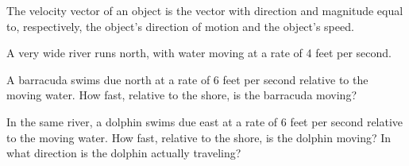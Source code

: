 The velocity vector of an object is the vector with direction and magnitude equal to, respectively, the object's direction of motion and the object's speed.

\begin{ex}
    A very wide river runs north, with water moving at a rate of 4 feet per second.
    
    A barracuda swims due north at a rate of 6 feet per second relative to the moving water. How fast, relative to the shore, is the barracuda moving?
\end{ex}

\vfill

\begin{ex}
    In the same river, a dolphin swims due east at a rate of 6 feet per second relative to the moving water. How fast, relative to the shore, is the dolphin moving? In what direction is the dolphin actually traveling?
\end{ex}
\vfill\vfill

